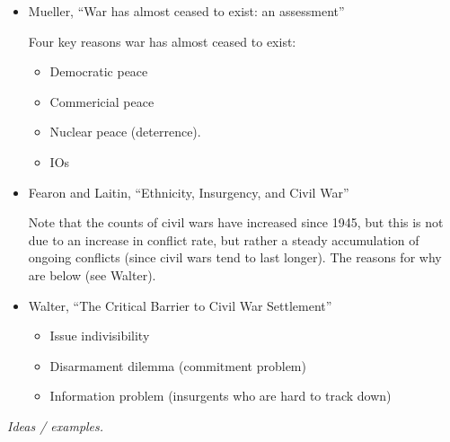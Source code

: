 \documentclass{article}
\begin{document}
\begin{itemize}
    \item Mueller, ``War has almost ceased to exist: an assessment''

      Four key reasons war has almost ceased to exist:

      \begin{itemize}
        \item Democratic peace
        \item Commericial peace
        \item Nuclear peace (deterrence).
        \item IOs
      \end{itemize}

    \item Fearon and Laitin, ``Ethnicity, Insurgency, and Civil War''

      Note that the counts of civil wars have increased since 1945, but this is not due to an increase in conflict rate, but rather a steady accumulation of ongoing conflicts (since civil wars tend to last longer).  The reasons for why are below (see Walter).

    \item Walter, ``The Critical Barrier to Civil War Settlement''

      \begin{itemize}
        \item Issue indivisibility
        \item Disarmament dilemma (commitment problem)
        \item Information problem (insurgents who are hard to track down)
      \end{itemize}
  \end{itemize}

  {\it Ideas / examples.}
\end{document}
